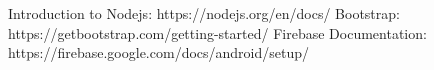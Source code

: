 \begin{thebibliography}{3}
\bibitem{} Introduction to Nodejs: https://nodejs.org/en/docs/
\bibitem{} Bootstrap: https://getbootstrap.com/getting-started/
\bibitem{} Firebase Documentation: https://firebase.google.com/docs/android/setup/
\end{thebibliography}